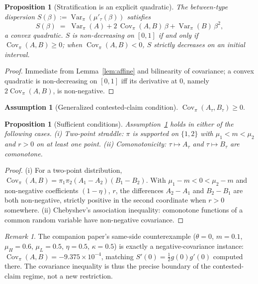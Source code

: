 \documentclass[11pt]{article}
\newtheorem{proposition}[theorem]{Proposition}
\theoremstyle{definition}
\newtheorem{assumption}[theorem]{Assumption}
\theoremstyle{remark}
\newtheorem{remark}[theorem]{Remark}
\numberwithin{equation}{section}
\DeclareMathOperator{\Var}{Var}
\DeclareMathOperator{\Cov}{Cov}
\begin{document}
\begin{proposition}[Stratification is an explicit quadratic]\label{prop:quad}
The between-type dispersion $S(\beta) := \Var_\pi(\mu'_\tau(\beta))$ satisfies
\begin{equation}\label{eq:Squad}
S(\beta) \;=\; \Var_\pi(A) + 2\,\Cov_\pi(A,B)\,\beta + \Var_\pi(B)\,\beta^2,
\end{equation}
a convex quadratic. $S$ is non-decreasing on $[0,1]$ if and only if $\Cov_\pi(A,B) \ge 0$; when $\Cov_\pi(A,B) < 0$, $S$ strictly decreases on an initial interval.
\end{proposition}
\begin{proof}
Immediate from Lemma~\ref{lem:affine} and bilinearity of covariance; a convex quadratic is non-decreasing on $[0,1]$ iff its derivative at $0$, namely $2\Cov_\pi(A,B)$, is non-negative.
\end{proof}

\begin{assumption}[Generalized contested-claim condition]\label{ass:cov}
$\Cov_\pi(A_\tau, B_\tau) \ge 0$.
\end{assumption}

\begin{proposition}[Sufficient conditions]\label{prop:suff}
Assumption~\ref{ass:cov} holds in either of the following cases. (i) Two-point straddle: $\pi$ is supported on $\{1,2\}$ with $\mu_1 < m < \mu_2$ and $r > 0$ on at least one point. (ii) Comonotonicity: $\tau \mapsto A_\tau$ and $\tau \mapsto B_\tau$ are comonotone.
\end{proposition}
\begin{proof}
(i) For a two-point distribution, $\Cov_\pi(A,B) = \pi_1\pi_2(A_1 - A_2)(B_1 - B_2)$. With $\mu_1 - m < 0 < \mu_2 - m$ and non-negative coefficients $(1-\eta)$, $r$, the differences $A_2 - A_1$ and $B_2 - B_1$ are both non-negative, strictly positive in the second coordinate when $r > 0$ somewhere. (ii) Chebyshev's association inequality: comonotone functions of a common random variable have non-negative covariance.
\end{proof}

\begin{remark}\label{rem:counterex}
The companion paper's same-side counterexample ($\theta = 0$, $m = 0.1$, $\mu_H = 0.6$, $\mu_L = 0.5$, $\eta = 0.5$, $\kappa = 0.5$) is exactly a negative-covariance instance: $\Cov_\pi(A,B) = -9.375 \times 10^{-4}$, matching $S'(0) = \tfrac{1}{2}g(0)g'(0)$ computed there. The covariance inequality is thus the precise boundary of the contested-claim regime, not a new restriction.
\end{remark}
\end{document}
